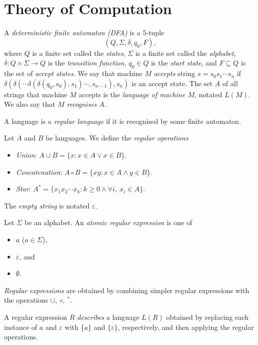\section{Theory of Computation}
\begin{defn}
  A \emph{deterministic finite automaton (DFA)} is a $5$-tuple 
  \[(Q,\Sigma,\delta,q_0,F),\] where $Q$
  is a finite set called the \emph{states}, $\Sigma$ is a finite set called the
  \emph{alphabet}, $\delta:Q\times\Sigma\to Q$ is the \emph{transition
  function}, $q_0\in Q$ is the \emph{start state}, and $F\subseteq Q$ is the
  set of \emph{accept states}.
  We say that machine $M$ \emph{accepts} string $s=s_0s_1\cdots s_n$ if
  $\delta(\delta(\cdots\delta(\delta(q_0,s_0),s_1)\cdots,s_{n-1}),s_n)$ is an
  accept state.
  The set $A$ of all strings that machine $M$ accepts is the \emph{language of
  machine $M$}, notated $L(M)$. We also say that $M$ \emph{recognises} $A$.
\end{defn}
\begin{defn}
  A language is a \emph{regular language} if it is recognised by some finite
  automaton.
\end{defn}
\begin{defn}
  Let $A$ and $B$ be languages. We define the \emph{regular operations}
  \begin{itemize}
    \item \emph{Union}: $A\cup B=\{x:x\in A\vee x\in B\}$.
    \item \emph{Concatenation}: $A\circ B=\{xy:x\in A\wedge y\in B\}$.
    \item \emph{Star}: $A^*=\{x_1x_2\cdots x_k: k\ge 0\wedge \forall i,\ x_i\in
      A\}$.
  \end{itemize}
\end{defn}
\begin{defn}
  The \emph{empty string} is notated $\varepsilon$.
\end{defn}
\begin{defn}
  Let $\Sigma$ be an alphabet. An \emph{atomic regular expression} is one of
  \begin{itemize}
    \item $a$ ($a\in\Sigma$),
    \item $\varepsilon$, and
    \item $\emptyset$.
  \end{itemize}

  \emph{Regular expressions} are obtained by combining simpler regular
  expressions with the operations $\cup,\ \circ,\ {}^*$.

  A regular expression $R$ \emph{describes} a language $L(R)$ obtained by
  replacing each instance
  of $a$ and $\varepsilon$ with $\{a\}$ and $\{\varepsilon\}$, respectively, and
  then applying the regular operations. 
\end{defn}
